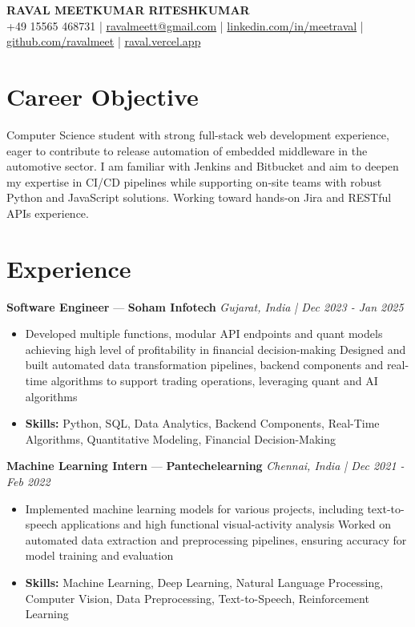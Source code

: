 \documentclass[a4paper,10pt]{article}
\begin{document}
\begin{center}
  {\Large\bfseries RAVAL MEETKUMAR RITESHKUMAR}\\[2pt]
  {\small +49 15565 468731 \;|\; \href{mailto:ravalmeett@gmail.com}{ravalmeett@gmail.com} \;|\; \href{https://www.linkedin.com/in/meetraval/}{linkedin.com/in/meetraval} \;|\; \href{https://github.com/ravalmeet}{github.com/ravalmeet} \;|\; \href{https://raval.vercel.app/}{raval.vercel.app}}
\end{center}
\vspace{-3pt}

\section*{Career Objective}
Computer Science student with strong full-stack web development experience, eager to contribute to release automation of embedded middleware in the automotive sector. I am familiar with Jenkins and Bitbucket and aim to deepen my expertise in CI/CD pipelines while supporting on-site teams with robust Python and JavaScript solutions. Working toward hands-on Jira and RESTful APIs experience.\par

\section*{Experience}
\textbf{Software Engineer} — \textbf{Soham Infotech} \hfill \textit{Gujarat, India \;|\; Dec 2023 - Jan 2025}\par
\vspace{1pt}
\begin{itemize}
  \item Developed multiple functions, modular API endpoints and quant models achieving high level of profitability in financial decision-making Designed and built automated data transformation pipelines, backend components and real-time algorithms to support trading operations, leveraging quant and AI algorithms
  \item \textbf{Skills:} Python, SQL, Data Analytics, Backend Components, Real-Time Algorithms, Quantitative Modeling, Financial Decision-Making
\end{itemize}
\vspace{3pt}
\textbf{Machine Learning Intern} — \textbf{Pantechelearning} \hfill \textit{Chennai, India \;|\; Dec 2021 - Feb 2022}\par
\vspace{1pt}
\begin{itemize}
  \item Implemented machine learning models for various projects, including text-to-speech applications and high functional visual-activity analysis Worked on automated data extraction and preprocessing pipelines, ensuring accuracy for model training and evaluation
  \item \textbf{Skills:} Machine Learning, Deep Learning, Natural Language Processing, Computer Vision, Data Preprocessing, Text-to-Speech, Reinforcement Learning
\end{itemize}
\end{document}
